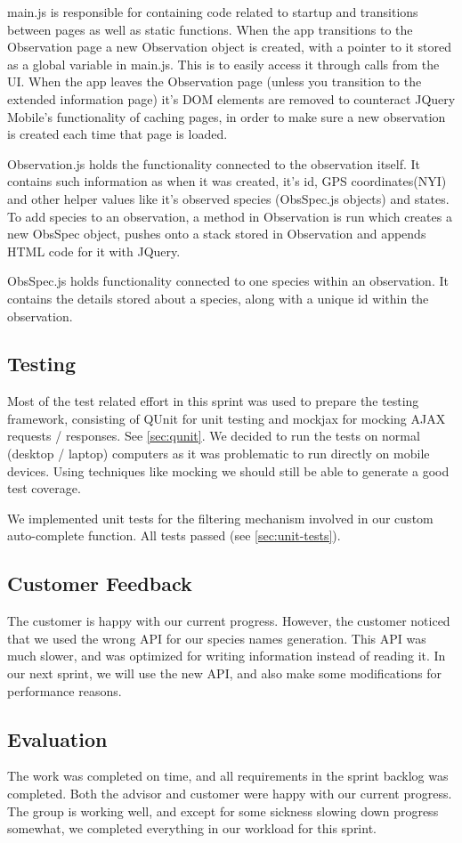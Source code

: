main.js is responsible for containing code related to startup and transitions between pages as well as static functions.
When the app transitions to the Observation page a new Observation object is created, with a pointer to it stored as a global variable in main.js.
This is to easily access it through calls from the UI. 
When the app leaves the Observation page (unless you transition to the extended information page) it's DOM elements are removed to counteract JQuery Mobile's functionality of caching pages, in order to make sure a new observation is created each time that page is loaded.

Observation.js holds the functionality connected to the observation itself.
It contains such information as when it was created, it's id, GPS coordinates(NYI) and other helper values like it's observed species (ObsSpec.js objects) and states.
To add species to an observation, a method in Observation is run which creates a new ObsSpec object, pushes onto a stack stored in Observation and appends HTML code for it with JQuery.

ObsSpec.js holds functionality connected to one species within an observation.
It contains the details stored about a species, along with a unique id within the observation.

\subsection{Testing}
Most of the test related effort in this sprint was used to prepare the
testing framework, consisting of QUnit for unit testing and mockjax for
mocking AJAX requests / responses. See \ref{sec:qunit}. We decided to run
the tests on normal (desktop / laptop) computers as it was problematic to
run directly on mobile devices. Using techniques like mocking we should
still be able to generate a good test coverage.

We implemented unit tests for the filtering mechanism involved in our custom
auto-complete function. All tests passed (see \ref{sec:unit-tests}).

\subsection{Customer Feedback}
The customer is happy with our current progress. However, the customer noticed that we used the wrong API for our species names generation. This API was much slower, and was optimized for writing information instead of reading it. In our next sprint, we will use the new API, and also make some modifications for performance reasons. 

\subsection{Evaluation}
The work was completed on time, and all requirements in the sprint backlog was completed. Both the advisor and customer were happy with our current progress. The group is working well, and except for some sickness slowing down progress somewhat, we completed everything in our workload for this sprint.
